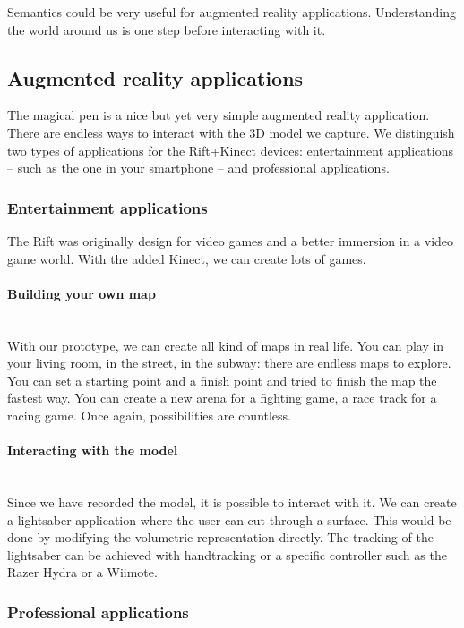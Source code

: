 \documentclass[12pt, twoside]{article}
\begin{document}
Semantics could be very useful for augmented reality applications. Understanding the world around us is one step before interacting with it.

\subsection{Augmented reality applications}
The magical pen is a nice but yet very simple augmented reality application. There are endless ways to interact with the 3D model we capture. We distinguish two types of applications for the Rift+Kinect devices: entertainment applications -- such as the one in your smartphone -- and professional applications.

\subsubsection{Entertainment applications}
The Rift was originally design for video games and a better immersion in a video game world. With the added Kinect, we can create lots of games.

\paragraph{Building your own map}~\\
With our prototype, we can create all kind of maps in real life. You can play in your living room, in the street, in the subway: there are endless maps to explore. You can set a starting point and a finish point and tried to finish the map the fastest way. You can create a new arena for a fighting game, a race track for a racing game. Once again, possibilities are countless.

\paragraph{Interacting with the model}~\\
Since we have recorded the model, it is possible to interact with it. We can create a lightsaber application where the user can cut through a surface. This would be done by modifying the volumetric representation directly. The tracking of the lightsaber can be achieved with handtracking or a specific controller such as the Razer Hydra or a Wiimote.

\subsubsection{Professional applications}
\end{document}
